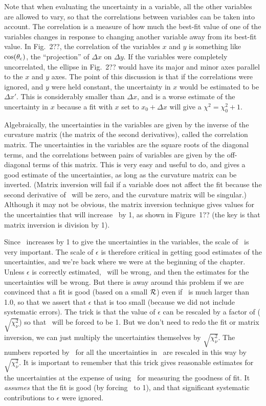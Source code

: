 {{Note that when evaluating the uncertainty in a variable, all the other
variables are allowed to vary, so that the correlations between variables
can be taken into account.  The correlation is a measure of how much
the best-fit value of one of the variables changes in response to
changing another variable away from its best-fit value.  In
Fig.~{2??}, the correlation of the variables $x$ and $y$ is
something like $\cos(\theta_{\rm c})$, the ``projection'' of $\Delta
x$ on $\Delta y$.  If the variables were completely uncorrelated, the
ellipse in Fig.~{2??} would have its major and minor axes
parallel to the $x$ and $y$ axes.  The point of this discussion is
that if the correlations were ignored, and $y$ were held constant, the
uncertainty in $x$ would be estimated to be $\Delta x'$.  This is
considerably smaller than $\Delta x$, and is a worse estimate of the
uncertainty in $x$ because a fit with $x$ set to $x_0 +\Delta x$ will
give a $\chi^2 = \chi^2_0 + 1 $.

Algebraically, the uncertainties in the variables are given by the
inverse of the curvature matrix (the matrix of the second
derivatives), called the correlation matrix.  The uncertainties in the
variables are the square roots of the diagonal terms, and the
correlations between pairs of variables are given by the off-diagonal
terms of this matrix.  This is very easy and useful to do, and gives a
good estimate of the uncertainties, as long as the curvature matrix
can be inverted.  (Matrix inversion will fail if a variable does not
affect the fit because the second derivative of \chisqr\ will be zero,
and the curvature matrix will be singular.)  Although it may not be
obvious, the matrix inversion technique gives values for the
uncertainties that will increase \chisqr\ by 1, as shown in
Figure~{1??} (the key is that matrix inversion is division
by 1). 

Since \chisqr\ increases by 1 to give the uncertainties in the
variables, the scale of \chisqr\ is very important.  The scale of
$\epsilon$ is therefore critical in getting good estimates of the
uncertainties, and we're back where we were at the beginning of the
chapter.  Unless $\epsilon$ is correctly estimated, \chisqr\ will be
wrong, and then the estimates for the uncertainties will be wrong.
But there is away around this problem if we are convinced that a fit
is good (based on a small $\cal R$) even if \redchi\ is much larger
than 1.0, so that we assert that $\epsilon$ that is too small (because
we did not include systematic errors).  The trick is that the value of
$\epsilon$ can be rescaled by a factor of ($\sqrt{\chi^2_{\nu} }$) so
that \redchi\ will be forced to be 1.  But we don't need to redo the
fit or matrix inversion, we can just multiply the uncertainties
themselves by $\sqrt{\chi^2_{\nu}}$.  The numbers reported by
\feffit\ for all the uncertainties in \feffitlog\ are rescaled in this
way by $\sqrt{\chi^2_{\nu}}$.  It is important to remember that this
trick gives reasonable estimates for the uncertainties at the expense
of using \redchi\ for measuring the goodness of fit.  It {\it assumes}
that the fit is good (by forcing \redchi\ to 1), and that significant
systematic contributions to $\epsilon$ were ignored.

}}
